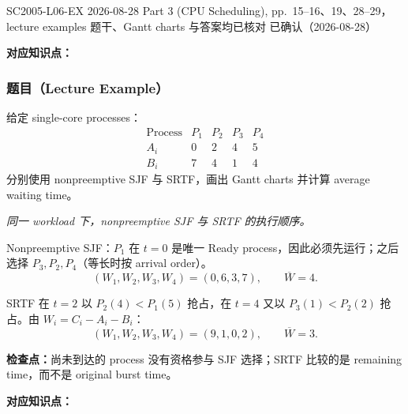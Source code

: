 

\examplemeta
  {SC2005-L06-EX}
  {2026-08-28}
  {Part 3 (CPU Scheduling), pp.~15--16、19、28--29，lecture examples}
  {题干、Gantt charts 与答案均已核对}
  {已确认（2026-08-28）}


\textbf{对应知识点：}

\subsubsection*{题目（Lecture Example）}

给定 single-core processes：
\[
\begin{array}{c|cccc}
  \text{Process} & P_1 & P_2 & P_3 & P_4\\ \hline
  A_i & 0 & 2 & 4 & 5\\
  B_i & 7 & 4 & 1 & 4
\end{array}
\]
分别使用 nonpreemptive SJF 与 SRTF，画出 Gantt charts 并计算 average waiting time。

\begin{checkedsolution}
\begin{center}
  \resizebox{0.96\textwidth}{!}{}

  \smallskip
  \textit{同一 workload 下，nonpreemptive SJF 与 SRTF 的执行顺序。}
\end{center}

Nonpreemptive SJF：$P_1$ 在 $t=0$ 是唯一 Ready process，因此必须先运行；之后选择 $P_3,P_2,P_4$（等长时按 arrival order）。
\[
  (W_1,W_2,W_3,W_4)=(0,6,3,7),\qquad \overline W=4.
\]

SRTF 在 $t=2$ 以 $P_2(4)<P_1(5)$ 抢占，在 $t=4$ 又以 $P_3(1)<P_2(2)$ 抢占。由 $W_i=C_i-A_i-B_i$：
\[
  (W_1,W_2,W_3,W_4)=(9,1,0,2),\qquad \overline W=3.
\]
\end{checkedsolution}

\textbf{检查点：}尚未到达的 process 没有资格参与 SJF 选择；SRTF 比较的是 remaining time，而不是 original burst time。


\textbf{对应知识点：}

